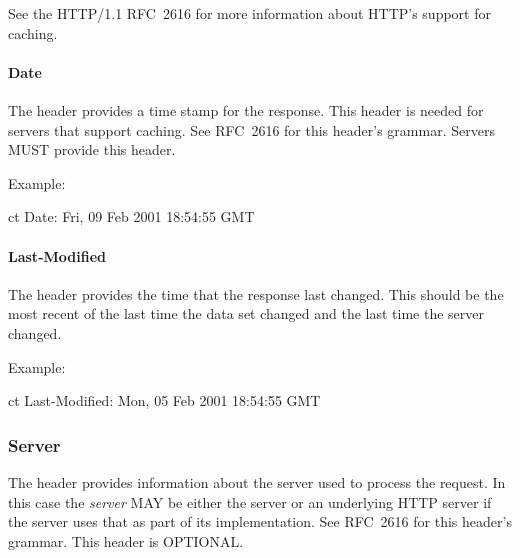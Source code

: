 \documentclass[justify]{nasa-ese}
\begin{document}
See the HTTP/1.1 RFC~2616\cite{rfc2616} for
more information about HTTP's support for caching.

\paragraph{Date}
The  header provides a time stamp for the response. This header
is needed for servers that support caching. See RFC~2616\cite{rfc2616}
for this header's grammar. Servers MUST provide this header.

Example:
\begin{vcode}{ct}
Date: Fri, 09 Feb 2001 18:54:55 GMT
\end{vcode}

\paragraph{Last-Modified}
The  header provides the time that the response
last changed. This should be the most recent of the last time the data
set changed and the last time the server changed. 

Example:
\begin{vcode}{ct}
Last-Modified: Mon, 05 Feb 2001 18:54:55 GMT
\end{vcode}


\subsubsection{Server}
The  header provides information about the server used to
process the request. In this case the \emph{server} MAY be either the
\DAP server or an underlying \ac{HTTP} server if the \DAP server uses
that as part of its implementation. See RFC~2616\cite{rfc2616}
for this header's grammar. This header is OPTIONAL.
\end{document}
